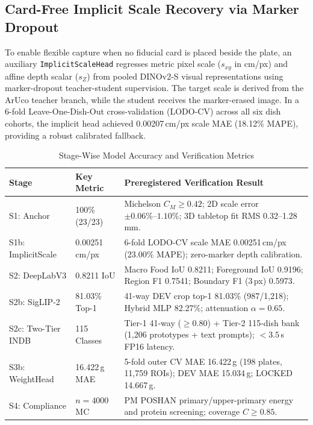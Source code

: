 \documentclass[conference]{IEEEtran}
\begin{document}
\subsection{Card-Free Implicit Scale Recovery via Marker Dropout}
To enable flexible capture when no fiducial card is placed beside the plate, an auxiliary \texttt{ImplicitScaleHead} regresses metric pixel scale ($s_{xy}$ in cm/px) and affine depth scalar ($s_Z$) from pooled DINOv2-S visual representations using marker-dropout teacher-student supervision. The target scale is derived from the ArUco teacher branch, while the student receives the marker-erased image. In a 6-fold Leave-One-Dish-Out cross-validation (LODO-CV) across all six dish cohorts, the implicit head achieved 0.00207\,cm/px scale MAE (18.12\% MAPE), providing a robust calibrated fallback.

\begin{table}[!t]
\caption{Stage-Wise Model Accuracy and Verification Metrics}
\label{tab:stage-metrics}
\centering
\scriptsize
\setlength{\tabcolsep}{3pt}
\begin{tabular}{llp{3.8cm}}
\toprule
\textbf{Stage} & \textbf{Key Metric} & \textbf{Preregistered Verification Result} \\
\midrule
S1: Anchor & 100\% (23/23) & Michelson $C_M \ge 0.42$; 2D scale error $\pm 0.06\%\text{--}1.10\%$; 3D tabletop fit RMS 0.32--1.28\,mm. \\
S1b: ImplicitScale & 0.00251\,cm/px & 6-fold LODO-CV scale MAE 0.00251\,cm/px (23.00\% MAPE); zero-marker depth calibration. \\
S2: DeepLabV3 & 0.8211 IoU & Macro Food IoU 0.8211; Foreground IoU 0.9196; Region F1 0.7541; Boundary F1 (3\,px) 0.5973. \\
S2b: SigLIP-2 & 81.03\% Top-1 & 41-way DEV crop top-1 81.03\% (987/1,218); Hybrid MLP 82.27\%; attenuation $\alpha=0.65$. \\
S2c: Two-Tier INDB & 115 Classes & Tier-1 41-way ($\ge 0.80$) + Tier-2 115-dish bank (1,206 prototypes + text prompts); $< 3.5$\,s FP16 latency. \\
S3b: WeightHead & 16.422\,g MAE & 5-fold outer CV MAE 16.422\,g (198 plates, 11,759 ROIs); DEV MAE 15.034\,g; LOCKED 14.667\,g. \\
S4: Compliance & $n=4000$ MC & PM POSHAN primary/upper-primary energy and protein screening; coverage $C \ge 0.85$. \\
\bottomrule
\end{tabular}
\end{table}
\end{document}
